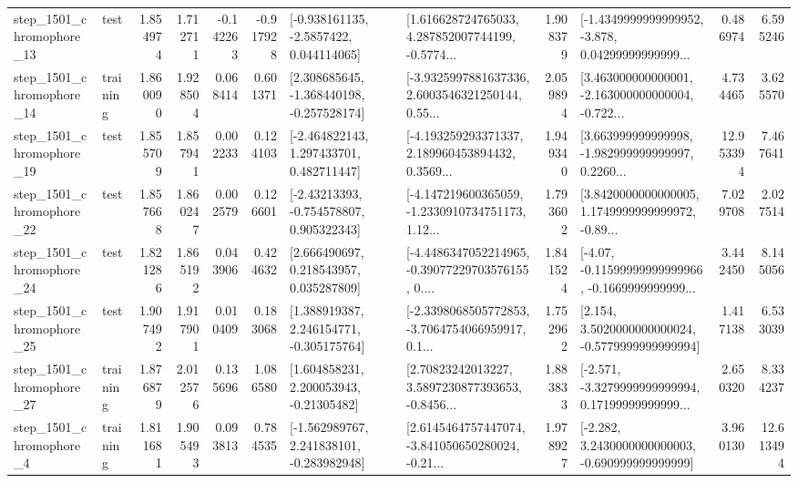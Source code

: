 \begin{tabular}{llrrrrllrlrr}
 step\_1501\_chromophore\_13 &      test &      1.854974 &    1.712711 &     -0.142263 & -0.917928 &     [-0.938161135, -2.5857422, 0.044114065] &  [1.616628724765033, 4.287852007744199, -0.5774... &       1.908379 &  [-1.4349999999999952, -3.878, 0.04299999999999... &            0.486974 &          6.595246 \\
 step\_1501\_chromophore\_14 &  training &      1.860090 &    1.928504 &      0.068414 &  0.601371 &   [2.308685645, -1.368440198, -0.257528174] &  [-3.9325997881637336, 2.6003546321250144, 0.55... &       2.059894 &  [3.463000000000001, -2.163000000000004, -0.722... &            4.734465 &          3.625570 \\
 step\_1501\_chromophore\_19 &      test &      1.855709 &    1.857941 &      0.002233 &  0.124103 &    [-2.464822143, 1.297433701, 0.482711447] &  [-4.193259293371337, 2.189960453894432, 0.3569... &       1.949340 &  [3.663999999999998, -1.982999999999997, 0.2260... &           12.953394 &          7.467641 \\
 step\_1501\_chromophore\_22 &      test &      1.857668 &    1.860247 &      0.002579 &  0.126601 &    [-2.43213393, -0.754578807, 0.905322343] &  [-4.147219600365059, -1.2330910734751173, 1.12... &       1.793602 &  [3.8420000000000005, 1.1749999999999972, -0.89... &            7.029708 &          2.027514 \\
 step\_1501\_chromophore\_24 &      test &      1.821286 &    1.865192 &      0.043906 &  0.424632 &     [2.666490697, 0.218543957, 0.035287809] &  [-4.4486347052214965, -0.39077229703576155, 0.... &       1.841524 &  [-4.07, -0.11599999999999966, -0.1669999999999... &            3.442450 &          8.145056 \\
 step\_1501\_chromophore\_25 &      test &      1.907492 &    1.917901 &      0.010409 &  0.183068 &    [1.388919387, 2.246154771, -0.305175764] &  [-2.3398068505772853, -3.7064754066959917, 0.1... &       1.752962 &   [2.154, 3.5020000000000024, -0.5779999999999994] &            1.417138 &          6.533039 \\
 step\_1501\_chromophore\_27 &  training &      1.876879 &    2.012576 &      0.135696 &  1.086580 &     [1.604858231, 2.200053943, -0.21305482] &  [2.70823242013227, 3.5897230877393653, -0.8456... &       1.883833 &  [-2.571, -3.3279999999999994, 0.17199999999999... &            2.650320 &          8.334237 \\
  step\_1501\_chromophore\_4 &  training &      1.811681 &    1.905493 &      0.093813 &  0.784535 &   [-1.562989767, 2.241838101, -0.283982948] &  [2.6145464757447074, -3.841050650280024, -0.21... &       1.978927 &   [-2.282, 3.2430000000000003, -0.690999999999999] &            3.960130 &         12.613494 \\

\end{tabular}
